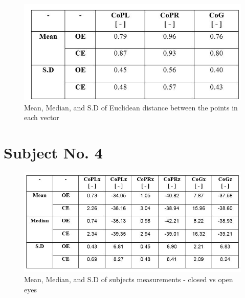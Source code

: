 \documentclass[twoside]{ctuthesis}
\theoremstyle{plain}
\theoremstyle{definition}
\theoremstyle{note}
\begin{document}
\begin{figure}[H]
	\centering
	\includegraphics[width = .8\textwidth]{Patient3DistTable}
	\begin{table}[H]
		\caption{Mean, Median, and S.D of Euclidean distance between the points in each vector}
	\end{table}
\end{figure}

\section{Subject No. 4}

\begin{figure}[H]
	\centering
	\includegraphics[width = \textwidth]{Patient4DataTable}
	\begin{table}[H]
		\caption{Mean, Median, and S.D of subjects measurements - closed vs open eyes}
	\end{table}
\end{figure}
\end{document}
